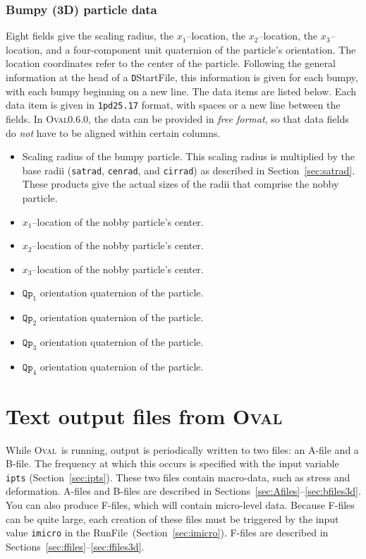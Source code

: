 \documentclass[letterpaper,11pt]{article}
\newcommand{\Oval}{\textsc{Oval}}
\newcommand{\RunFile}{\textsf{RunFile}}
\begin{document}
\subsubsection{Bumpy (3D) particle data}\label{sec:bumpy_data}
Eight fields give the scaling radius, 
the $x_{1}$--location, the $x_{2}$--location, 
the $x_{3}$--location, and a four-component unit quaternion
of the particle's orientation.
The location coordinates refer to the center of the particle.
Following the general information at the head of a
\texttt{D}\textsf{StartFile}, this
information is given for each bumpy,
with each bumpy beginning on a new line.
The data items are listed below.
Each data item is given in \texttt{1pd25.17} format, with
spaces or a new line between the fields.
In \Oval0.6.0, the data can be provided in \emph{free format},
so that data fields do \emph{not} have to be aligned
within certain columns.
\begin{itemize}
\item
Scaling radius of the bumpy particle.
This scaling radius is multiplied by the base radii
(\texttt{satrad}, \texttt{cenrad}, and \texttt{cirrad}) as described
in Section~\ref{sec:satrad}.
These products give the actual sizes of the radii that comprise
the nobby particle.
\item
$x_{1}$--location of the nobby particle's center.
\item
$x_{2}$--location of the nobby particle's center.
\item
$x_{3}$--location of the nobby particle's center.
\item
$\mathtt{Qp}_{1}$ orientation quaternion of the particle.
\item
$\mathtt{Qp}_{2}$ orientation quaternion of the particle.
\item
$\mathtt{Qp}_{3}$ orientation quaternion of the particle.
\item
$\mathtt{Qp}_{4}$ orientation quaternion of the particle.
\end{itemize}
%
%
\section{Text output files from \Oval}\label{sec:MacroOutput}
While \Oval\ is running,
output is periodically written to two files:
an A-file and a B-file.
The frequency at which this occurs is specified with the input variable
\texttt{ipts} (Section~\ref{sec:ipts}).
These two files contain macro-data, such as stress and
deformation.
A-files and B-files are described in 
Sections~\ref{sec:Afiles}--\ref{sec:bfiles3d}.
You can also produce F-files, which will contain micro-level data.
Because F-files can be quite large, each creation of these files must
be triggered by the input value \texttt{imicro} in the
\RunFile\ (Section~\ref{sec:imicro}).
F-files are described in Sections~\ref{sec:ffiles}--\ref{sec:ffiles3d}.
%
\end{document}
